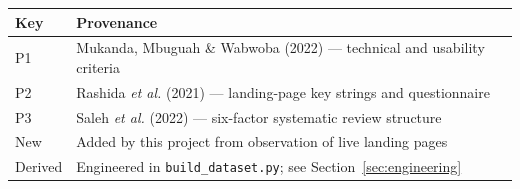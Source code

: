 \begin{tabular}{ll}
\toprule
\textbf{Key} & \textbf{Provenance} \\
\midrule
P1 & Mukanda, Mbuguah \& Wabwoba (2022) --- technical and usability criteria \\
P2 & Rashida \emph{et al.} (2021) --- landing-page key strings and questionnaire \\
P3 & Saleh \emph{et al.} (2022) --- six-factor systematic review structure \\
New & Added by this project from observation of live landing pages \\
Derived & Engineered in \texttt{build\_dataset.py}; see Section~\ref{sec:engineering} \\
\bottomrule
\end{tabular}
